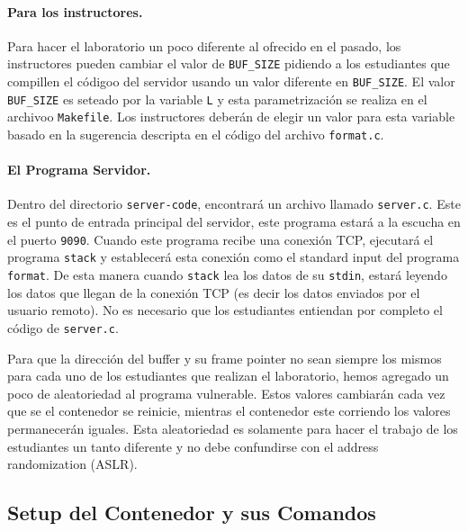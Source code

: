 \paragraph{Para los instructores.} 
Para hacer el laboratorio un poco diferente al ofrecido en el pasado, los instructores pueden cambiar el valor de \texttt{BUF\_SIZE} pidiendo a los estudiantes que compillen el códigoo del servidor usando un valor diferente en \texttt{BUF\_SIZE}.
El valor \texttt{BUF\_SIZE} es seteado por la variable \texttt{L} y esta parametrización se realiza en el archivoo \texttt{Makefile}. Los instructores deberán de elegir un valor para esta variable basado en la sugerencia descripta en el código del archivo \texttt{format.c}.


\paragraph{El Programa Servidor.}
Dentro del directorio \texttt{server-code}, encontrará un archivo llamado \texttt{server.c}.
Este es el punto de entrada principal del servidor, este programa estará a la escucha en el puerto \texttt{9090}. 
Cuando este programa recibe una conexión TCP, ejecutará el programa \texttt{stack} y establecerá esta conexión como el standard input del programa \texttt{format}. De esta manera cuando \texttt{stack} lea los datos de su \texttt{stdin}, estará leyendo los datos que llegan de la conexión TCP (es decir los datos enviados por el usuario remoto). No es necesario que los estudiantes entiendan por completo el código de \texttt{server.c}.

Para que la dirección del buffer y su frame pointer no sean siempre los mismos para cada uno de los estudiantes que realizan el laboratorio, hemos agregado un poco de aleatoriedad al programa vulnerable. Estos valores cambiarán cada vez que se el contenedor se reinicie, mientras el contenedor este corriendo los valores permanecerán iguales. Esta aleatoriedad es solamente para hacer el trabajo de los estudiantes un tanto diferente y no debe confundirse con el address randomization (ASLR).


\subsection{Setup del Contenedor y sus Comandos}




